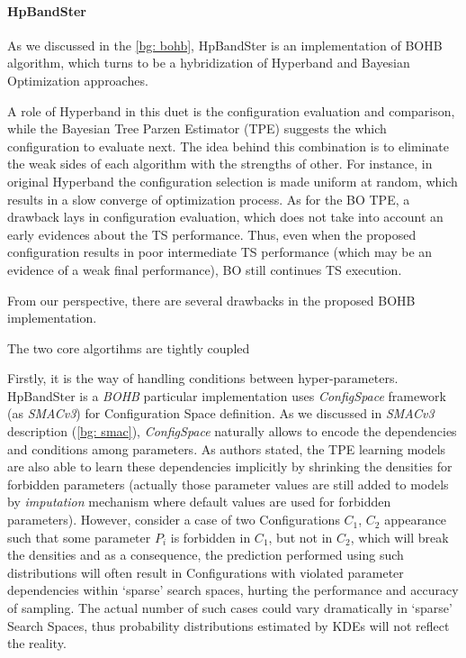 \paragraph{HpBandSter}
As we discussed in the \cref{bg: bohb}, HpBandSter is an implementation of BOHB algorithm, which turns to be a hybridization of Hyperband and Bayesian Optimization approaches.

A role of Hyperband in this duet is the configuration evaluation and comparison, while the Bayesian Tree Parzen Estimator (TPE) suggests the which configuration to evaluate next. The idea behind this combination is to eliminate the weak sides of each algorithm with the strengths of other. For instance, in original Hyperband the configuration selection is made uniform at random, which results in a slow converge of optimization process. As for the BO TPE, a drawback lays in configuration evaluation, which does not take into account an early evidences about the TS performance. Thus, even when the proposed configuration results in poor intermediate TS performance (which may be an evidence of a weak final performance), BO still continues TS execution. 

From our perspective, there are several drawbacks in the proposed BOHB implementation.

The two core algortihms are tightly coupled

Firstly, it is the way of handling conditions between hyper-parameters. HpBandSter is a \textit{BOHB} particular implementation uses \textit{ConfigSpace} framework (as \textit{SMACv3}) for Configuration Space definition. As we discussed in \textit{SMACv3} description (\cref{bg: smac}), \textit{ConfigSpace} naturally allows to encode the dependencies and conditions among parameters. As authors stated, the TPE learning models are also able to learn these dependencies implicitly by shrinking the densities for forbidden parameters (actually those parameter values are still added to models by \textit{imputation} mechanism where default values are used for forbidden parameters). However, consider a case of two Configurations $C_1$, $C_2$ appearance such that some parameter $P_i$ is forbidden in $C_1$, but not in $C_2$, which will break the densities and as a consequence, the prediction performed using such distributions will often result in Configurations with violated parameter dependencies within `sparse' search spaces, hurting the performance and accuracy of sampling. The actual number of such cases could vary dramatically in `sparse' Search Spaces, thus probability distributions estimated by KDEs will not reflect the reality.


